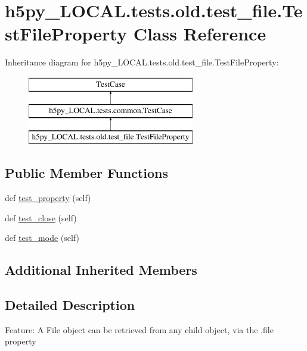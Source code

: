 \hypertarget{classh5py__LOCAL_1_1tests_1_1old_1_1test__file_1_1TestFileProperty}{}\section{h5py\+\_\+\+L\+O\+C\+A\+L.\+tests.\+old.\+test\+\_\+file.\+Test\+File\+Property Class Reference}
\label{classh5py__LOCAL_1_1tests_1_1old_1_1test__file_1_1TestFileProperty}
Inheritance diagram for h5py\+\_\+\+L\+O\+C\+A\+L.\+tests.\+old.\+test\+\_\+file.\+Test\+File\+Property\+:\begin{figure}[H]
\begin{center}
\leavevmode
\includegraphics[height=3.000000cm]{classh5py__LOCAL_1_1tests_1_1old_1_1test__file_1_1TestFileProperty}
\end{center}
\end{figure}
\subsection*{Public Member Functions}
\begin{DoxyCompactItemize}
\item 
def \hyperlink{classh5py__LOCAL_1_1tests_1_1old_1_1test__file_1_1TestFileProperty_a73ac7d6211c1fa0c87f9ed29c4a4afdb}{test\+\_\+property} (self)
\item 
def \hyperlink{classh5py__LOCAL_1_1tests_1_1old_1_1test__file_1_1TestFileProperty_aef260b3ef85ad380a8bdaa1d4a0a2c16}{test\+\_\+close} (self)
\item 
def \hyperlink{classh5py__LOCAL_1_1tests_1_1old_1_1test__file_1_1TestFileProperty_af7bc8378d30485224618c7e9d127441b}{test\+\_\+mode} (self)
\end{DoxyCompactItemize}
\subsection*{Additional Inherited Members}


\subsection{Detailed Description}
\begin{DoxyVerb}    Feature: A File object can be retrieved from any child object,
    via the .file property
\end{DoxyVerb}
 

